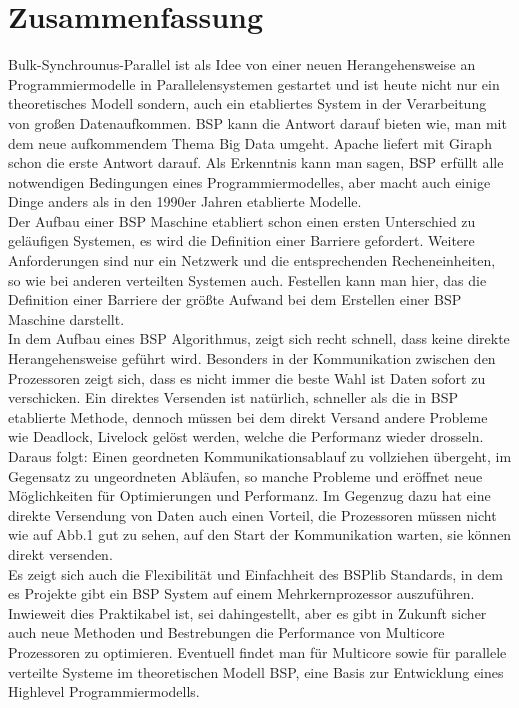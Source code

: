 \documentclass[a4paper,10pt]{scrartcl}
\begin{document}
\section{Zusammenfassung}
Bulk-Synchrounus-Parallel ist als Idee von einer neuen Herangehensweise an Programmiermodelle in Parallelensystemen gestartet und ist heute nicht nur ein theoretisches Modell sondern, auch ein etabliertes System in der Verarbeitung von großen Datenaufkommen. BSP kann die Antwort darauf bieten wie, man mit dem neue aufkommendem Thema Big Data umgeht. Apache liefert mit Giraph schon die erste Antwort darauf. Als Erkenntnis kann man sagen, BSP erfüllt alle notwendigen Bedingungen eines Programmiermodelles, aber macht auch einige Dinge anders als in den 1990er Jahren etablierte Modelle.\\
Der Aufbau einer BSP Maschine etabliert schon einen ersten Unterschied zu geläufigen Systemen, es wird die Definition einer Barriere gefordert. Weitere Anforderungen sind nur ein Netzwerk und die entsprechenden Recheneinheiten, so wie bei anderen verteilten Systemen auch. Festellen kann man hier, das die Definition einer Barriere der größte Aufwand bei dem Erstellen einer BSP Maschine darstellt.\\
In dem Aufbau eines BSP Algorithmus, zeigt sich recht schnell, dass keine direkte Herangehensweise geführt wird. Besonders in der Kommunikation zwischen den Prozessoren zeigt sich, dass es nicht immer die beste Wahl ist Daten sofort zu verschicken. Ein direktes Versenden ist natürlich, schneller als die in BSP etablierte Methode, dennoch müssen bei dem direkt Versand andere Probleme wie Deadlock, Livelock gelöst werden, welche die Performanz wieder drosseln. Daraus folgt: Einen geordneten Kommunikationsablauf zu vollziehen übergeht, im Gegensatz zu ungeordneten Abläufen, so manche Probleme und eröffnet neue Möglichkeiten für Optimierungen und Performanz. Im Gegenzug dazu hat eine direkte Versendung von Daten auch einen Vorteil, die Prozessoren müssen nicht wie auf Abb.1 gut zu sehen, auf den Start der Kommunikation warten, sie können direkt versenden.\\  
Es zeigt sich auch die Flexibilität und Einfachheit des BSPlib Standards, in dem es Projekte gibt ein BSP System auf einem Mehrkernprozessor auszuführen. Inwieweit dies Praktikabel ist, sei dahingestellt, aber es gibt in Zukunft sicher auch neue Methoden und Bestrebungen die Performance von Multicore Prozessoren zu optimieren. Eventuell findet man für Multicore sowie für parallele verteilte Systeme im theoretischen Modell BSP, eine Basis zur Entwicklung eines Highlevel Programmiermodells.\\
\end{document}
